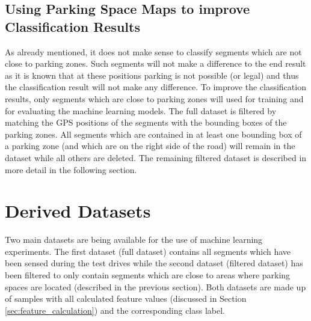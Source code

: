 \subsection{Using Parking Space Maps to improve Classification Results}
\label{sec:parking_space_maps_improve_classification}

As already mentioned, it does not make sense to classify segments which are not close to parking zones. Such segments will not make a difference to the end result as it is known that at these positions parking is not possible (or legal) and thus the classification result will not make any difference. 
To improve the classification results, only segments which are close to parking zones will used for training and for evaluating the machine learning models. The full dataset is filtered by matching the GPS positions of the segments with the bounding boxes of the parking zones. All segments which are contained in at least one bounding box of a parking zone (and which are on the right side of the road) will remain in the dataset while all others are deleted. The remaining filtered dataset is described in more detail in the following section.









\section{Derived Datasets}
\label{sec:derived_dataset}

Two main datasets are being available for the use of machine learning experiments. The first dataset (full dataset) contains all segments which have been sensed during the test drives while the second dataset (filtered dataset) has been filtered to only contain segments which are close to areas where parking spaces are located (described in the previous section). Both datasets are made up of samples with all calculated feature values (discussed in Section \ref{sec:feature_calculation}) and the corresponding class label.

